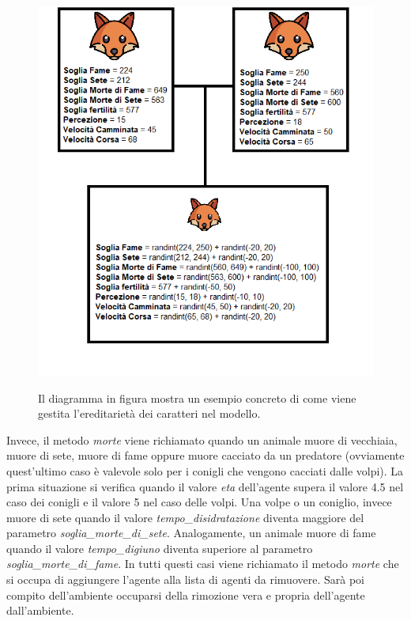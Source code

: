 \documentclass[11pt]{article}
\begin{document}
\begin{figure}[h!]
     \centering
     \includegraphics[scale = 0.8]{Accoppiamento_evoluzione.png}
     \label{fig:EsempioEvoluzione}
     \caption{Il diagramma in figura mostra un esempio concreto di come viene gestita l'ereditarietà dei caratteri nel modello.}
\end{figure}

Invece, il metodo \emph{morte} viene richiamato quando un animale muore di vecchiaia, muore di sete, muore di fame oppure muore cacciato da un predatore (ovviamente quest'ultimo caso è valevole solo per i conigli che vengono cacciati dalle volpi). La prima situazione si verifica quando il valore \emph{eta} dell'agente supera il valore 4.5 nel caso dei conigli e il valore 5 nel caso delle volpi. Una volpe o un coniglio, invece muore di sete quando il valore \emph{tempo\_disidratazione} diventa maggiore del parametro \emph{soglia\_morte\_di\_sete}. Analogamente, un animale muore di fame quando il valore \emph{tempo\_digiuno} diventa superiore al parametro \emph{soglia\_morte\_di\_fame}. In tutti questi casi viene richiamato il metodo \emph{morte} che si occupa di aggiungere l'agente alla lista di agenti da rimuovere. Sarà poi compito dell'ambiente occuparsi della rimozione vera e propria dell'agente dall'ambiente. 
\end{document}

